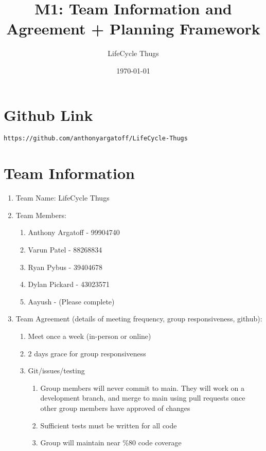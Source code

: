 \documentclass{article}
\title{M1: Team Information and Agreement + Planning Framework}
\author{LifeCycle Thugs}
\date{\today}
\begin{document}
\maketitle

\section*{Github Link}
\begin{verbatim}
https://github.com/anthonyargatoff/LifeCycle-Thugs
\end{verbatim}

\section*{Team Information}
\begin{enumerate}
    \item Team Name: LifeCycle Thugs
    \item Team Members:
        \begin{enumerate}
            \item Anthony Argatoff - 99904740
            \item Varun Patel - 88268834
            \item Ryan Pybus - 39404678
            \item Dylan Pickard - 43023571
            \item Aayush - (Please complete)
        \end{enumerate}
    \item Team Agreement (details of meeting frequency, group responsiveness, github):
        \begin{enumerate}
            \item Meet once a week (in-person or online)
            \item 2 days grace for group responsiveness
            \item Git/issues/testing
            \begin{enumerate}
                \item Group members will never commit to main. They will work on a development branch, and merge to main using pull requests once other group members have approved of changes
                \item Sufficient tests must be written for all code
                \item Group will maintain near \%80 code coverage
            \end{enumerate}
        \end{enumerate}

\end{enumerate}
\end{document}
